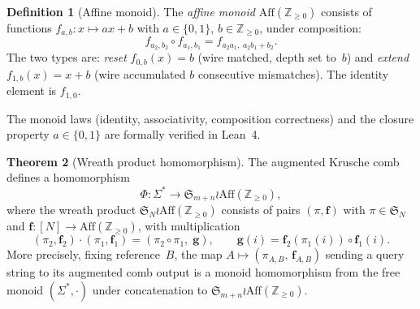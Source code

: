 \documentclass[11pt, a4paper]{article}
\theoremstyle{definition}
\newtheorem{theorem}{Theorem}
\newtheorem{definition}[theorem]{Definition}
\theoremstyle{remark}
\newcommand{\perm}{\pi}
\begin{document}
\begin{definition}[Affine monoid]
\label{def:affine-monoid}
The \emph{affine monoid} $\mathrm{Aff}(\mathbb{Z}_{\geq 0})$
consists of functions $f_{a,b}: x \mapsto ax + b$ with
$a \in \{0, 1\}$, $b \in \mathbb{Z}_{\geq 0}$, under
composition:
\[
  f_{a_2, b_2} \circ f_{a_1, b_1}
    = f_{a_2 a_1,\; a_2 b_1 + b_2}.
\]
The two types are:
\emph{reset} $f_{0,b}(x) = b$ (wire matched, depth set to~$b$)
and \emph{extend} $f_{1,b}(x) = x + b$ (wire accumulated $b$
consecutive mismatches).
The identity element is $f_{1,0}$.
\end{definition}

The monoid laws (identity, associativity, composition
correctness) and the closure property $a \in \{0,1\}$ are
formally verified in Lean~4.

\begin{theorem}[Wreath product homomorphism]
\label{thm:wreath}
The augmented Krusche comb defines a homomorphism
\[
  \Phi: \Sigma^*
    \longrightarrow
    \mathfrak{S}_{m+n} \wr \mathrm{Aff}(\mathbb{Z}_{\geq 0}),
\]
where the wreath product
$\mathfrak{S}_N \wr \mathrm{Aff}(\mathbb{Z}_{\geq 0})$
consists of pairs $(\perm, \mathbf{f})$ with
$\perm \in \mathfrak{S}_N$ and
$\mathbf{f}: [N] \to \mathrm{Aff}(\mathbb{Z}_{\geq 0})$,
with multiplication
\[
  (\perm_2, \mathbf{f}_2) \cdot (\perm_1, \mathbf{f}_1)
    = (\perm_2 \circ \perm_1,\; \mathbf{g}),
  \qquad
  \mathbf{g}(i) = \mathbf{f}_2(\perm_1(i)) \circ \mathbf{f}_1(i).
\]
More precisely, fixing reference~$B$, the map
$A \mapsto (\perm_{A,B},\, \mathbf{f}_{A,B})$ sending a
query string to its augmented comb output is a monoid
homomorphism from the free monoid $(\Sigma^*, {\cdot})$ under
concatenation to
$\mathfrak{S}_{m+n} \wr
  \mathrm{Aff}(\mathbb{Z}_{\geq 0})$.
\end{theorem}
\end{document}
